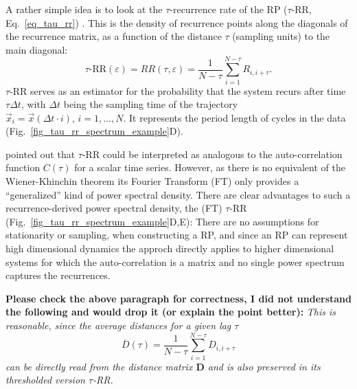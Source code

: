 \documentclass[entropy,article,submit,pdftex,moreauthors]{Definitions/mdpi}
\begin{document}
A rather simple idea is to look at the $\tau$-recurrence rate of the RP ($\tau$-RR, Eq.~\ref{eq_tau_rr}) \cite{marwan2002pla,Zbilut2008}.
This is the density of recurrence points along the diagonals of the recurrence matrix, as a function of the distance $\tau$ (sampling units) to the main diagonal:
\begin{equation}\label{eq_tau_rr}
\tau\text{-RR}(\varepsilon) = RR(\tau, \varepsilon) = \frac{1}{N-\tau} \sum_{i=1}^{N-\tau	} R_{i,i+\tau}.
\end{equation}
$\tau$-RR serves as an estimator for the probability that the system recurs after time $\tau \Delta t$, with $\Delta t$ being the sampling time of the trajectory 
$\vec{x}_i = \vec{x}(\Delta t \cdot i),\, i=1,\ldots,N$. 
It represents the period length of cycles in the data (Fig.~\ref{fig_tau_rr_spectrum_example}D).

\citet{Zbilut2008} pointed out that $\tau$-RR could be interpreted as analogous to the auto-correlation function $C(\tau)$ for a scalar time series.
However, as there is no equivalent of the Wiener-Khinchin theorem its Fourier Transform (FT) only provides a ``generalized'' kind of power spectral density.
There are clear advantages to such a recurrence-derived power spectral density, the (FT) $\tau$-RR (Fig.~\ref{fig_tau_rr_spectrum_example}D,E):
There are no assumptions for stationarity or sampling, when constructing a RP, 
and since an RP can represent high dimensional dynamics the approch directly applies to higher dimensional systems for which the auto-correlation is a  matrix and no single power spectrum captures the recurrences.

\textbf{Please check the above paragraph for correctness, I did not understand the following and would drop it (or explain the point better):}
\textit{This is reasonable, since the average distances for a given lag $\tau$ 
\begin{equation}
\overline{D}(\tau) = \frac{1}{N-\tau}\sum_{i=1}^{N-\tau} D_{i, i+\tau}
\end{equation}
can be directly read from the distance matrix $\mathbf{D}$ and is also preserved in its thresholded version $\tau$-RR.}
\end{document}
